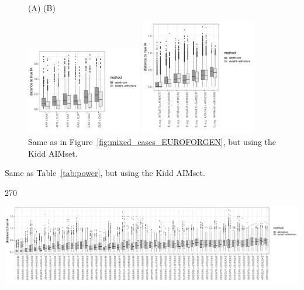 \documentclass[12pt]{article}
\theoremstyle{definition}
\begin{document}
\begin{figure}[H]
  \hspace{3cm} (A) \hspace{8cm} (B)
  \begin{center}
    \parbox[b]{0.45\textwidth}{\includegraphics[width=0.45\textwidth]{deviations_mixed_Kidd.pdf}\vspace{2cm}}
    \hspace{1cm}
    \parbox[b]{0.45\textwidth}{\includegraphics[width=0.45\textwidth]{deviations_mixed_cases_Kidd.pdf}}
  \end{center}
  \caption{\label{fig:mixed_cases_Kidd} Same as in
    Figure~\ref{fig:mixed_cases_EUROFORGEN}, but using the Kidd
    AIMset.}
\end{figure}

\begin{table}[H]
  \centering
  
  \caption{Same as Table~\ref{tab:power}, but using the Kidd AIMset.}
  \label{tab:power_Kidd}
\end{table}

\begin{center}
  \begin{turn}{270}%
    \begin{minipage}{\textheight}
      \includegraphics[width=\textwidth]{deviations_mixed_allcases_Kidd.pdf}
      \label{fig:mixed_allcases_Kidd}
    \end{minipage}
  \end{turn}
\end{center}
\end{document}
